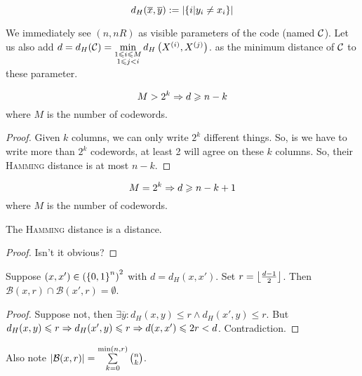 \begin{definition}
    \[
        d_H(\overline{x}, \overline{y}) := \left\lvert\left\{ i\vert y_i\neq x_i \right\}\right\rvert
    \]
\end{definition}

We immediately see $(n, nR)$ as visible parameters of the code (named $\mathcal{C}$). Let us also add $d = d_H(\mathcal{C}) = \min\limits_{\substack{1\leqslant i\leqslant M\\1\leqslant j < i}} d_H\left(X^{(i)}, X^{(j)}\right)$. as the minimum distance of $\mathcal{C}$ to these parameter.


\begin{theorem}
    \[
        M > 2^k \Rightarrow d \geqslant n - k
    \]
    where $M$ is the number of codewords.
\end{theorem}
\begin{proof}
    Given $k$ columns, we can only write $2^k$ different things. So, is we have to write more than $2^k$ codewords, at least 2 will agree on these $k$ columns. So, their \textsc{Hamming} distance is at most $n - k$.
\end{proof}

\begin{corollary}
    \[
        M = 2^k \Rightarrow d \geqslant n - k + 1
    \]
    where $M$ is the number of codewords.
\end{corollary}

\begin{theorem}
    The \textsc{Hamming} distance is a distance.
\end{theorem}
\begin{proof}
    Isn't it obvious?
\end{proof}

\begin{corollary}
    Suppose $(x, x') \in \left(\left\{ 0,1 \right\}^n\right)^2$ with $d = d_H(x, x')$. Set $r = \left \lfloor  \frac{d-1}{2} \right \rfloor$. Then $\mathcal{B}(x, r) \cap \mathcal{B}(x',r) = \emptyset$.
\end{corollary}
\begin{proof}
    Suppose not, then $\exists \overline{y} : d_H(x,y) \leqslant r \wedge d_H(x',y) \leqslant r$. But $d_H(x,y) \leqslant r \Rightarrow d_H(x',y) \leqslant r \Rightarrow d(x,x') \leqslant 2r < d$. Contradiction.
\end{proof}

Also note $\left\lvert\mathcal{B}(x,r)\right\rvert = \sum\limits_{k=0}^{\min(n,r)}\binom{n}{k}$.

